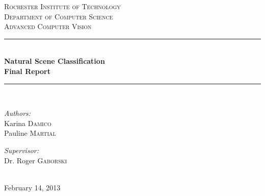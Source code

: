 \documentclass[%
	final,
	narroweqnarray,
	notitlepage,
	inline,
	twoside,
	]{ieee}
\begin{document}

\begin{titlepage}

\newcommand{\HRule}{\rule{\linewidth}{0.5mm}} %

\center %
 

\textsc{\LARGE Rochester Institute of Technology}\\[1.5cm] %
\textsc{\Large Department of Computer Science}\\[0.5cm] %
\textsc{\large Advanced Computer Vision}\\[2cm] %


\HRule \\[0.4cm]
{ \huge \bfseries Natural Scene Classification\\
\bigskip
Final Report}\\[0.7cm] %
\HRule \\[1.5cm]

\begin{minipage}{0.8\textwidth}
\begin{flushleft} \large
\emph{Authors:}\\
Karina \textsc{Damico} \\
Pauline \textsc{Martial} %
\end{flushleft}
\end{minipage}

\begin{minipage}{0.8\textwidth}
\begin{flushright} \large
\emph{Supervisor:} \\
Dr. Roger \textsc{Gaborski} %
\end{flushright}
\end{minipage}\\[5cm]

{\large February 14, 2013}\\[3cm] 
\vfill %
\end{titlepage}              
\nopagebreak
\tableofcontents
\newpage
\end{document}

